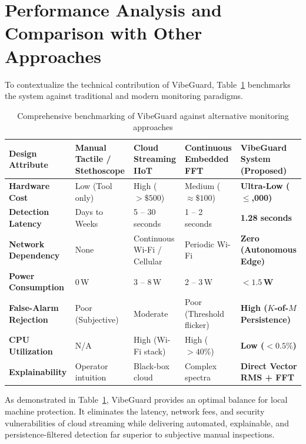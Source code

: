 \section{Performance Analysis and Comparison with Other Approaches}
To contextualize the technical contribution of VibeGuard, Table~\ref{tab:comparison} benchmarks the system against traditional and modern monitoring paradigms.

\begin{table}[H]
\centering
\small
\begin{tabular}{|l|p{2.6cm}|p{2.6cm}|p{2.6cm}|p{3.2cm}|}
\hline
\textbf{Design Attribute} & \textbf{Manual Tactile / Stethoscope} & \textbf{Cloud Streaming IIoT} & \textbf{Continuous Embedded FFT} & \textbf{VibeGuard System (Proposed)} \\
\hline
\textbf{Hardware Cost} & Low (Tool only) & High ($>\$\text{500}$) & Medium ($\approx\$\text{100}$) & \textbf{Ultra-Low ($\le$\rupee 3,000)} \\
\textbf{Detection Latency} & Days to Weeks & 5 -- 30 seconds & 1 -- 2 seconds & \textbf{1.28 seconds} \\
\textbf{Network Dependency} & None & Continuous Wi-Fi / Cellular & Periodic Wi-Fi & \textbf{Zero (Autonomous Edge)} \\
\textbf{Power Consumption} & 0\,W & 3 -- 8\,W & 2 -- 3\,W & \textbf{$<1.5$\,W} \\
\textbf{False-Alarm Rejection} & Poor (Subjective) & Moderate & Poor (Threshold flicker) & \textbf{High ($K$-of-$M$ Persistence)} \\
\textbf{CPU Utilization} & N/A & High (Wi-Fi stack) & High ($>40\%$) & \textbf{Low ($<0.5\%$)} \\
\textbf{Explainability} & Operator intuition & Black-box cloud & Complex spectra & \textbf{Direct Vector RMS + FFT} \\
\hline
\end{tabular}
\caption{Comprehensive benchmarking of VibeGuard against alternative monitoring approaches}
\label{tab:comparison}
\end{table}

As demonstrated in Table~\ref{tab:comparison}, VibeGuard provides an optimal balance for local machine protection. It eliminates the latency, network fees, and security vulnerabilities of cloud streaming while delivering automated, explainable, and persistence-filtered detection far superior to subjective manual inspections.

